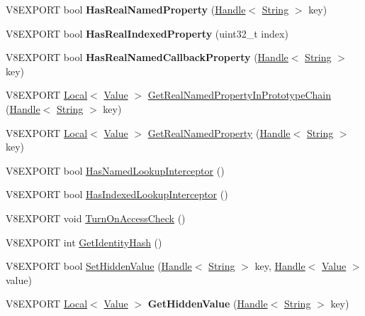 \begin{DoxyCompactItemize}
\item 
\hypertarget{classv8_1_1_object_ad5f2524b42102c4feb63fe5e17eaec83}{}V8\+E\+X\+P\+O\+R\+T bool {\bfseries Has\+Real\+Named\+Property} (\hyperlink{classv8_1_1_handle}{Handle}$<$ \hyperlink{classv8_1_1_string}{String} $>$ key)\label{classv8_1_1_object_ad5f2524b42102c4feb63fe5e17eaec83}

\item 
\hypertarget{classv8_1_1_object_ae1835a3c20cb3bf485e575f4c82aa5af}{}V8\+E\+X\+P\+O\+R\+T bool {\bfseries Has\+Real\+Indexed\+Property} (uint32\+\_\+t index)\label{classv8_1_1_object_ae1835a3c20cb3bf485e575f4c82aa5af}

\item 
\hypertarget{classv8_1_1_object_a7d3dbdffefc92245e04b0828aa0e770d}{}V8\+E\+X\+P\+O\+R\+T bool {\bfseries Has\+Real\+Named\+Callback\+Property} (\hyperlink{classv8_1_1_handle}{Handle}$<$ \hyperlink{classv8_1_1_string}{String} $>$ key)\label{classv8_1_1_object_a7d3dbdffefc92245e04b0828aa0e770d}

\item 
V8\+E\+X\+P\+O\+R\+T \hyperlink{classv8_1_1_local}{Local}$<$ \hyperlink{classv8_1_1_value}{Value} $>$ \hyperlink{classv8_1_1_object_ab955e6c94dc6bf3e65e5355eb3d2d876}{Get\+Real\+Named\+Property\+In\+Prototype\+Chain} (\hyperlink{classv8_1_1_handle}{Handle}$<$ \hyperlink{classv8_1_1_string}{String} $>$ key)
\item 
V8\+E\+X\+P\+O\+R\+T \hyperlink{classv8_1_1_local}{Local}$<$ \hyperlink{classv8_1_1_value}{Value} $>$ \hyperlink{classv8_1_1_object_a353c1568c4de35ef3f3065b5a4aecc50}{Get\+Real\+Named\+Property} (\hyperlink{classv8_1_1_handle}{Handle}$<$ \hyperlink{classv8_1_1_string}{String} $>$ key)
\item 
V8\+E\+X\+P\+O\+R\+T bool \hyperlink{classv8_1_1_object_ad0791109068a7816d65a06bbc9f6f870}{Has\+Named\+Lookup\+Interceptor} ()
\item 
V8\+E\+X\+P\+O\+R\+T bool \hyperlink{classv8_1_1_object_afd36ea440a254335bde065a4ceafffb3}{Has\+Indexed\+Lookup\+Interceptor} ()
\item 
V8\+E\+X\+P\+O\+R\+T void \hyperlink{classv8_1_1_object_aa2299eda3240be1e76b7d5c2af7a6bbc}{Turn\+On\+Access\+Check} ()
\item 
V8\+E\+X\+P\+O\+R\+T int \hyperlink{classv8_1_1_object_a5309f7a349feb906a05ee45b6feeaab1}{Get\+Identity\+Hash} ()
\item 
V8\+E\+X\+P\+O\+R\+T bool \hyperlink{classv8_1_1_object_a0040e3012d621b25f580407bacebf95f}{Set\+Hidden\+Value} (\hyperlink{classv8_1_1_handle}{Handle}$<$ \hyperlink{classv8_1_1_string}{String} $>$ key, \hyperlink{classv8_1_1_handle}{Handle}$<$ \hyperlink{classv8_1_1_value}{Value} $>$ value)
\item 
\hypertarget{classv8_1_1_object_af3634e494683aee31ea57ca493cc016a}{}V8\+E\+X\+P\+O\+R\+T \hyperlink{classv8_1_1_local}{Local}$<$ \hyperlink{classv8_1_1_value}{Value} $>$ {\bfseries Get\+Hidden\+Value} (\hyperlink{classv8_1_1_handle}{Handle}$<$ \hyperlink{classv8_1_1_string}{String} $>$ key)\label{classv8_1_1_object_af3634e494683aee31ea57ca493cc016a}


\end{DoxyCompactItemize}
